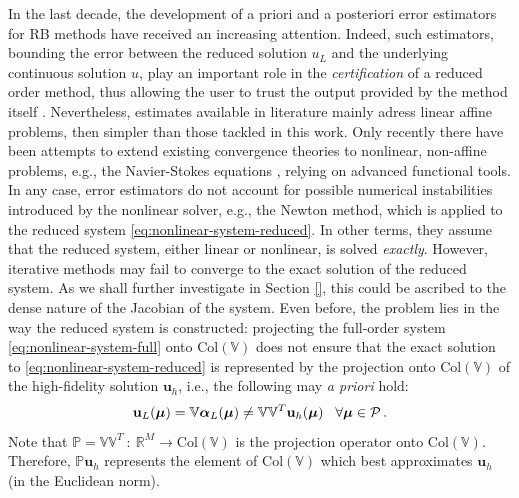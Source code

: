 \documentclass[12pt, a4paper, twoside, openright]{report}
\numberwithin{equation}{chapter}
\theoremstyle{theorem}
\theoremstyle{definition}
\theoremstyle{remark}
\theoremstyle{proposition}
\numberwithin{figure}{chapter}
\begin{document}
		In the last decade, the development of a priori and a posteriori error estimators for RB methods have received an increasing attention. Indeed, such estimators, bounding the error between the reduced solution $u_L$ and the underlying continuous solution $u$, play an important role in the \emph{certification} of a reduced order method, thus allowing the user to trust the output provided by the method itself \cite{HSR16}. Nevertheless, estimates available in literature mainly adress linear affine problems, then simpler than those tackled in this work. Only recently there have been attempts to extend existing convergence theories to nonlinear, non-affine problems, e.g., the Navier-Stokes equations \cite{QMN15}, relying on advanced functional tools. In any case, error estimators do not account for possible numerical instabilities introduced by the nonlinear solver, e.g., the Newton method, which is applied to the reduced system \eqref{eq:nonlinear-system-reduced}. In other terms, they assume that the reduced system, either linear or nonlinear, is solved \emph{exactly}. However, iterative methods may fail to converge to the exact solution of the reduced system. As we shall further investigate in Section \ref{}, this could be ascribed to the dense nature of the Jacobian of the system. Even before, the problem lies in the way the reduced system is constructed: projecting the full-order system \eqref{eq:nonlinear-system-full} onto $\text{Col}(\mathbb{V})$ does not ensure that the exact solution to \eqref{eq:nonlinear-system-reduced} is represented by the projection onto $\text{Col}(\mathbb{V})$ of the high-fidelity solution $\mathbf{u}_h$, i.e., the following may \emph{a priori} hold:
		\begin{equation}
			\label{eq:rb-vs-projection}
			\mathbf{u}_L(\boldsymbol{\mu}) = \mathbb{V} \boldsymbol{\alpha}_L(\boldsymbol{\mu}) \neq \mathbb{V} \mathbb{V}^T \mathbf{u}_h(\boldsymbol{\mu}) \hspace*{0.3cm} \forall \boldsymbol{\mu} \in \mathcal{P} \, .
		\end{equation}
		Note that $\mathbb{P} = \mathbb{V} \mathbb{V}^T ~ : ~ \mathbb{R}^M \rightarrow \text{Col}(\mathbb{V})$ is the projection operator onto $\text{Col}(\mathbb{V})$. Therefore, $\mathbb{P} \boldsymbol{u}_h$ represents the element of $\text{Col}(\mathbb{V})$ which best approximates $\mathbf{u}_h$ (in the Euclidean norm). 
		
\end{document}
